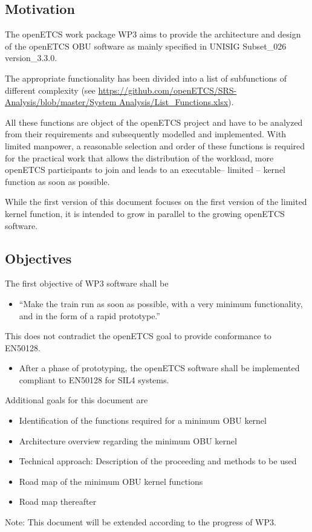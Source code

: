 
\subsection{Motivation}
\label{sec:Motivation}

The openETCS work package WP3 aims to provide the architecture and design of the openETCS OBU software as mainly specified in UNISIG Subset\_026 version\_3.3.0. 

The appropriate functionality has been divided into a list of subfunctions of different complexity (see \url{https://github.com/openETCS/SRS-Analysis/blob/master/System Analysis/List\_Functions.xlsx}).

All these functions are object of the openETCS project and have to be analyzed from their requirements and subsequently modelled and implemented. With limited manpower, a reasonable selection and order of these functions is required for the practical work that allows the distribution of the workload, more openETCS participants to join and leads to an executable– limited – kernel function as soon as possible. 

While the first version of this document focuses on the first version of the limited kernel function, it is intended to grow in parallel to the growing openETCS software.


\subsection{Objectives}
\label{sec:Objectives}



The first objective of WP3 software shall be

\begin{itemize}
	\item “Make the train run as soon as possible, with a very minimum functionality, and in the form of a rapid prototype.”
\end{itemize}

This does not contradict the openETCS goal to provide conformance to EN50128.

\begin{itemize}
	\item After a phase of prototyping, the openETCS software shall be implemented compliant to EN50128 for SIL4 systems.
\end{itemize}

Additional goals for this document are

\begin{itemize}
	\item Identification of the functions required for a minimum OBU kernel
	\item Architecture overview regarding the minimum OBU kernel
	\item Technical approach: Description of the proceeding and methods to be used
	\item Road map of the minimum OBU kernel functions
	\item Road map thereafter
\end{itemize}

Note: This document will be extended according to the progress of WP3. 



